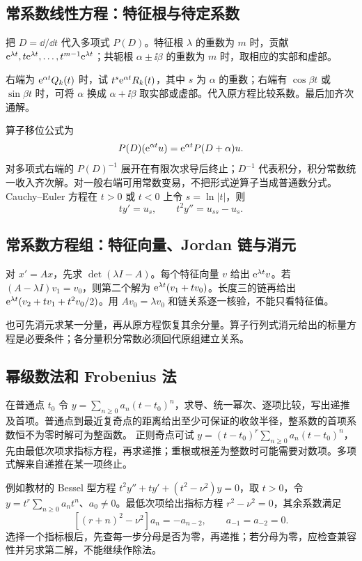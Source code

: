 \subsection{常系数线性方程：特征根与待定系数}
把 $D=\dd/\dd t$ 代入多项式 $P(D)$。特征根 $\lambda$ 的重数为 $m$ 时，贡献 $\mathrm e^{\lambda t},t\mathrm e^{\lambda t},\ldots,t^{m-1}\mathrm e^{\lambda t}$；共轭根 $\alpha\pm\ii\beta$ 的重数为 $m$ 时，取相应的实部和虚部。

右端为 $\mathrm e^{\alpha t}Q_k(t)$ 时，试 $t^s\mathrm e^{\alpha t}R_k(t)$，其中 $s$ 为 $\alpha$ 的重数；右端有 $\cos\beta t$ 或 $\sin\beta t$ 时，可将 $\alpha$ 换成 $\alpha+\ii\beta$ 取实部或虚部。代入原方程比较系数。最后加齐次通解。

算子移位公式为
\[
 P(D)(\mathrm e^{\alpha t}u)=\mathrm e^{\alpha t}P(D+\alpha)u.
\]
对多项式右端的 $P(D)^{-1}$ 展开在有限次求导后终止；$D^{-1}$ 代表积分，积分常数统一收入齐次解。对一般右端可用常数变易，不把形式逆算子当成普通数分式。
Cauchy--Euler 方程在 $t>0$ 或 $t<0$ 上令 $s=\ln|t|$，则
\[
 ty'=u_s,\qquad t^2y''=u_{ss}-u_s.
\]
\subsection{常系数方程组：特征向量、Jordan 链与消元}
对 $x'=Ax$，先求 $\det(\lambda I-A)$。每个特征向量 $v$ 给出 $\mathrm e^{\lambda t}v$。若 $(A-\lambda I)v_1=v_0$，则第二个解为 $\mathrm e^{\lambda t}(v_1+tv_0)$。长度三的链再给出 $\mathrm e^{\lambda t}(v_2+tv_1+t^2v_0/2)$。用 $Av_0=\lambda v_0$ 和链关系逐一核验，不能只看特征值。

也可先消元求某一分量，再从原方程恢复其余分量。算子行列式消元给出的标量方程是必要条件；各分量积分常数必须回代原组建立关系。
\subsection{幂级数法和 Frobenius 法}
在普通点 $t_0$ 令 $y=\sum_{n\ge0}a_n(t-t_0)^n$，求导、统一幂次、逐项比较，写出递推及首项。普通点到最近复奇点的距离给出至少可保证的收敛半径，整系数的首项系数恒不为零时解可为整函数。
正则奇点可试 $y=(t-t_0)^r\sum_{n\ge0}a_n(t-t_0)^n$，先由最低次项求指标方程，再求递推；重根或根差为整数时可能需要对数项。多项式解来自递推在某一项终止。

例如教材的 Bessel 型方程 $t^2y''+ty'+(t^2-\nu^2)y=0$，取 $t>0$，令 $y=t^r\sum_{n\ge0}a_nt^n$、$a_0\ne0$。最低次项给出指标方程 $r^2-\nu^2=0$，其余系数满足
\[
 [(r+n)^2-\nu^2]a_n=-a_{n-2},\qquad a_{-1}=a_{-2}=0.
\]
选择一个指标根后，先查每一步分母是否为零，再递推；若分母为零，应检查兼容性并另求第二解，不能继续作除法。
